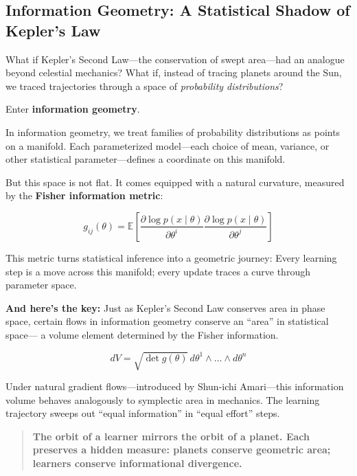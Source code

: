 \subsection{Information Geometry: A Statistical Shadow of Kepler's Law}

What if Kepler’s Second Law—the conservation of swept area—had an analogue beyond celestial mechanics?  
What if, instead of tracing planets around the Sun, we traced trajectories through a space of \textit{probability distributions}?

Enter \textbf{information geometry}.

In information geometry, we treat families of probability distributions as points on a manifold.  
Each parameterized model—each choice of mean, variance, or other statistical parameter—defines a coordinate on this manifold.

But this space is not flat.  
It comes equipped with a natural curvature, measured by the \textbf{Fisher information metric}:

\[
g_{ij}(\theta) = \mathbb{E}\left[ \frac{\partial \log p(x \mid \theta)}{\partial \theta^i} \frac{\partial \log p(x \mid \theta)}{\partial \theta^j} \right]
\]

This metric turns statistical inference into a geometric journey:  
Every learning step is a move across this manifold; every update traces a curve through parameter space.

\medskip

\noindent
\textbf{And here’s the key:}  
Just as Kepler’s Second Law conserves area in phase space,  
certain flows in information geometry conserve an “area” in statistical space—  
a volume element determined by the Fisher information.

\[
dV = \sqrt{\det g(\theta)} \, d\theta^1 \wedge \dots \wedge d\theta^n
\]

Under natural gradient flows—introduced by Shun-ichi Amari—this information volume behaves analogously to symplectic area in mechanics.  
The learning trajectory sweeps out “equal information” in “equal effort” steps.

\begin{quote}
\textbf{The orbit of a learner mirrors the orbit of a planet.  
Each preserves a hidden measure:  
planets conserve geometric area; learners conserve informational divergence.}
\end{quote}


